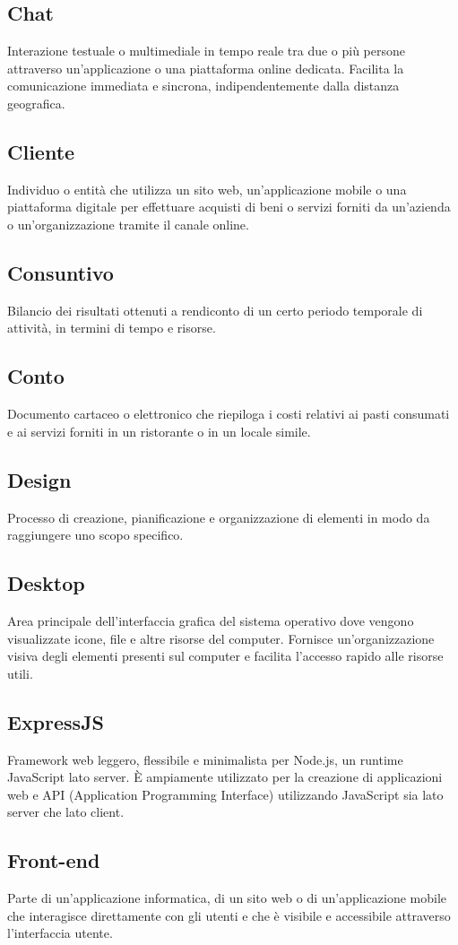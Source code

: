 \subsection{Chat}Interazione testuale o multimediale in tempo reale tra due o più persone attraverso un'applicazione o una piattaforma online dedicata. Facilita la comunicazione immediata e sincrona, indipendentemente dalla distanza geografica.
\subsection{Cliente}Individuo o entità che utilizza un sito web, un'applicazione mobile o una piattaforma digitale per effettuare acquisti di beni o servizi forniti da un'azienda o un'organizzazione tramite il canale online.
\subsection{Consuntivo}Bilancio dei risultati ottenuti a rendiconto di un certo periodo temporale di attività, in termini di tempo e risorse.
\subsection{Conto}Documento cartaceo o elettronico che riepiloga i costi relativi ai pasti consumati e ai servizi forniti in un ristorante o in un locale simile.
\subsection{Design}Processo di creazione, pianificazione e organizzazione di elementi in modo da raggiungere uno scopo specifico.
\subsection{Desktop}Area principale dell'interfaccia grafica del sistema operativo dove vengono visualizzate icone, file e altre risorse del computer. Fornisce un'organizzazione visiva degli elementi presenti sul computer e facilita l'accesso rapido alle risorse utili.
\subsection{ExpressJS}Framework web leggero, flessibile e minimalista per Node.js, un runtime JavaScript lato server. È ampiamente utilizzato per la creazione di applicazioni web e API (Application Programming Interface) utilizzando JavaScript sia lato server che lato client.
\subsection{Front-end}Parte di un'applicazione informatica, di un sito web o di un'applicazione mobile che interagisce direttamente con gli utenti e che è visibile e accessibile attraverso l'interfaccia utente.
